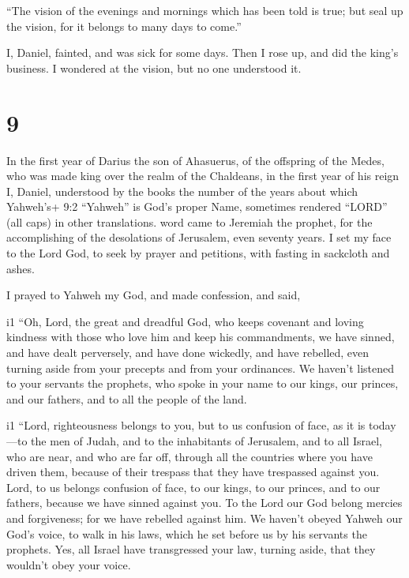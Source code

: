  ``The vision of the evenings and mornings which has been
told is true; but seal up the vision, for it belongs to many days to
come.''

 I, Daniel, fainted, and was sick for some days. Then I
rose up, and did the king's business. I wondered at the vision, but no
one understood it.

\hypertarget{section-8}{%
\section{9}\label{section-8}}

 In the first year of Darius the son of Ahasuerus, of the
offspring of the Medes, who was made king over the realm of the
Chaldeans,  in the first year of his reign I, Daniel,
understood by the books the number of the years about which Yahweh's+
9:2 ``Yahweh'' is God's proper Name, sometimes rendered ``LORD'' (all
caps) in other translations. word came to Jeremiah the prophet, for the
accomplishing of the desolations of Jerusalem, even seventy years.
 I set my face to the Lord God, to seek by prayer and
petitions, with fasting in sackcloth and ashes.

 I prayed to Yahweh my God, and made confession, and said,

i1 ``Oh, Lord, the great and dreadful God, who keeps covenant and loving
kindness with those who love him and keep his commandments, 
we have sinned, and have dealt perversely, and have done wickedly, and
have rebelled, even turning aside from your precepts and from your
ordinances.  We haven't listened to your servants the
prophets, who spoke in your name to our kings, our princes, and our
fathers, and to all the people of the land.

i1 ``Lord, righteousness belongs to you, but to us confusion
of face, as it is today---to the men of Judah, and to the inhabitants of
Jerusalem, and to all Israel, who are near, and who are far off, through
all the countries where you have driven them, because of their trespass
that they have trespassed against you.  Lord, to us belongs
confusion of face, to our kings, to our princes, and to our fathers,
because we have sinned against you.  To the Lord our God
belong mercies and forgiveness; for we have rebelled against him.
 We haven't obeyed Yahweh our God's voice, to walk in his
laws, which he set before us by his servants the prophets. 
Yes, all Israel have transgressed your law, turning aside, that they
wouldn't obey your voice.

